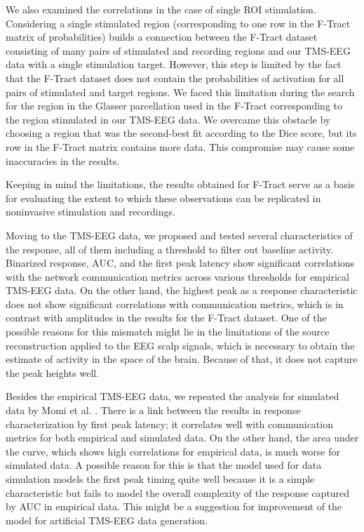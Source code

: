 We also examined the correlations in the case of single ROI stimulation. Considering a single stimulated region (corresponding to one row in the F-Tract matrix of probabilities) builds a connection between the F-Tract dataset consisting of many pairs of stimulated and recording regions and our TMS-EEG data with a single stimulation target. However, this step is limited by the fact that the F-Tract dataset does not contain the probabilities of activation for all pairs of stimulated and target regions. We faced this limitation during the search for the region in the Glasser parcellation used in the F-Tract corresponding to the region stimulated in our TMS-EEG data. We overcame this obstacle by choosing a region that was the second-best fit according to the Dice score, but its row in the F-Tract matrix contains more data. This compromise may cause some inaccuracies in the results.

Keeping in mind the limitations, the results obtained for F-Tract serve as a basis for evaluating the extent to which these observations can be replicated in noninvasive stimulation and recordings. 

Moving to the TMS-EEG data, we proposed and tested several characteristics of the response, all of them including a threshold to filter out baseline activity. Binarized response, AUC, and the first peak latency show significant correlations with the network communication metrics across various thresholds for empirical TMS-EEG data. On the other hand, the highest peak as a response characteristic does not show significant correlations with communication metrics, which is in contrast with amplitudes in the results for the F-Tract dataset. One of the possible reasons for this mismatch might lie in the limitations of the source reconstruction applied to the EEG scalp signals, which is necessary to obtain the estimate of activity in the space of the brain. Because of that, it does not capture the peak heights well.

Besides the empirical TMS-EEG data, we repeated the analysis for simulated data by Momi et al. \cite{momi_tms-evoked_2023}. There is a link between the results in response characterization by first peak latency; it correlates well with communication metrics for both empirical and simulated data. On the other hand, the area under the curve, which shows high correlations for empirical data, is much worse for simulated data. A possible reason for this is that the model used for data simulation models the first peak timing quite well because it is a simple characteristic but fails to model the overall complexity of the response captured by AUC in empirical data. This might be a suggestion for improvement of the model for artificial TMS-EEG data generation.

